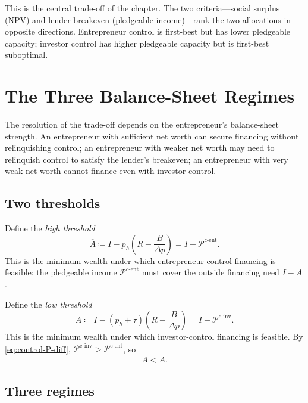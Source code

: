 \documentclass[11pt,a4paper,oneside]{book}
\theoremstyle{plain}
\theoremstyle{definition}
\theoremstyle{remark}
\numberwithin{equation}{chapter}
\begin{document}
This is the central trade-off of the chapter.
The two criteria---social surplus (NPV) and lender breakeven (pledgeable income)---rank the two allocations in opposite directions.
Entrepreneur control is first-best but has lower pledgeable capacity; investor control has higher pledgeable capacity but is first-best suboptimal.

\section{The Three Balance-Sheet Regimes}
\label{sec:control-regimes}

The resolution of the trade-off depends on the entrepreneur's balance-sheet strength.
An entrepreneur with sufficient net worth can secure financing without relinquishing control; an entrepreneur with weaker net worth may need to relinquish control to satisfy the lender's breakeven; an entrepreneur with very weak net worth cannot finance even with investor control.

\subsection{Two thresholds}

Define the \emph{high threshold}
\begin{equation}\label{eq:control-Aupper}
  \overline{A} \coloneqq I - p_h\left(R - \frac{B}{\Delta p}\right) = I - \mathcal{P}^{\text{c-ent}}.
\end{equation}
This is the minimum wealth under which entrepreneur-control financing is feasible: the pledgeable income $\mathcal{P}^{\text{c-ent}}$ must cover the outside financing need $I - A$.

Define the \emph{low threshold}
\begin{equation}\label{eq:control-Alower}
  \underline{A} \coloneqq I - (p_h + \tau)\left(R - \frac{B}{\Delta p}\right) = I - \mathcal{P}^{\text{c-inv}}.
\end{equation}
This is the minimum wealth under which investor-control financing is feasible.
By \eqref{eq:control-P-diff}, $\mathcal{P}^{\text{c-inv}} > \mathcal{P}^{\text{c-ent}}$, so
\begin{equation*}
  \underline{A} < \overline{A}.
\end{equation*}

\subsection{Three regimes}
\end{document}
